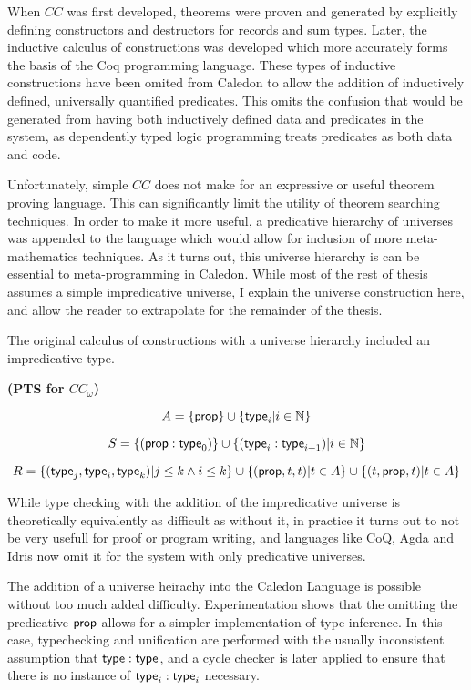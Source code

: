 When $CC$ was first developed, theorems were proven and generated by explicitly defining
constructors and destructors for records and sum types.  Later, the inductive calculus of constructions was developed 
\citep{coquand1990inductively} which more accurately forms the basis of the Coq programming language.  These types of inductive
constructions have been omited from Caledon to allow the addition of inductively defined, universally quantified predicates.
This omits the confusion that would be generated from having both inductively defined data and predicates in the system, as 
dependently typed logic programming treats predicates as both data and code.

Unfortunately, simple $CC$ does not make for an expressive or useful theorem proving language.  
This can significantly limit the utility of theorem searching techniques.  
In order to make it more useful, a predicative hierarchy of universes 
was appended to the language which would allow for inclusion of more meta-mathematics techniques.
As it turns out, this universe hierarchy is can be essential to meta-programming in Caledon.  
While most of the rest of thesis assumes a simple impredicative universe, I explain the 
universe construction here, and allow the reader to extrapolate for the remainder of the thesis.

The original calculus of constructions with a universe hierarchy included an impredicative type.  

\begin{definition}
\textbf{(PTS for $CC_\omega$)}

\[
A = \{ \mathsf{prop} \} \cup \{ \mathsf{type}_i | i \in \mathbb{N} \}
\]

\[
S =   \{ (\mathsf{prop} : \mathsf{type}_0 ) \}
 \cup \{ (\mathsf{type}_i : \mathsf{type}_{i+1} ) | i \in \mathbb{N} \}
\]

\[ 
R = \{ (\mathsf{type}_j,\mathsf{type}_i,\mathsf{type}_k) | j \leq k \wedge i \leq k \}
\cup \{ (\mathsf{prop},t,t) | t \in A \}
\cup \{ (t,\mathsf{prop},t) | t \in A \}
\]

\label{coc:utypes}
\end{definition}

While type checking with the addition of the impredicative universe is theoretically equivalently as difficult 
as without it, in practice it turns out to not be very usefull for proof or program writing, and 
languages like CoQ, Agda and Idris now omit it for the system with only predicative universes.

The addition of a universe heirachy into the Caledon Language is possible without too much added difficulty. 
Experimentation shows that the omitting the predicative $\mathsf{prop}$ allows for a simpler implementation of type inference.
In this case, typechecking and unification are performed with the usually inconsistent assumption that
$\mathsf{type} : \mathsf{type}$, and a cycle checker is later applied to ensure that there is no instance of 
$\mathsf{type}_i : \mathsf{type}_i$ necessary.  

